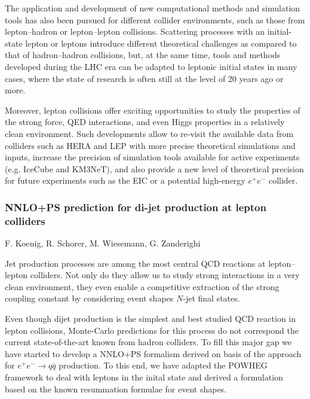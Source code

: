 \documentclass{FBR_Bericht_2025}
\begin{document}
\begin{refsection}
The application and development of new computational methods and simulation tools has also 
been pursued for different collider environments, such as those from lepton--hadron or lepton--lepton collisions.
%
Scattering processes with an initial-state lepton or leptons introduce different theoretical 
challenges as compared to that of hadron--hadron collisions, but, at the same time, tools
and methods developed during the LHC era can be adapted to leptonic initial states
in many cases, where the state of research is often still at the level of 20 years ago or more.

Moreover, lepton collisions offer exciting opportunities to study the properties of the strong force, QED interactions, and even Higgs properties in a relatively clean environment.
%
Such developments allow to re-visit the available data from colliders such as HERA and LEP with more precise theoretical simulations and inputs, increase the precision of simulation tools available for active experiments (e.g. IceCube and KM3NeT), and also provide a new level of theoretical precision for future experiments such as the EIC or a potential high-energy $e^+e^-$ collider. 
%
\subsubsection{NNLO+PS prediction for di-jet production at lepton colliders}
\begin{Namen}
F. Koenig, R. Schorer, M. Wiesemann, G. Zanderighi
\end{Namen}

Jet production processes are among the most central QCD reactions at lepton--lepton colliders.
Not only do they allow us to study strong interactions in a very clean environment, they even 
enable a competitive extraction of the strong coupling constant by considering event shapes 
$N$-jet final states.

Even though dijet production is the simplest and best studied QCD reaction in lepton collisions,
Monte-Carlo predictions for this process do not correspond the current state-of-the-art known
from hadron colliders. To fill this major gap we have started to develop a NNLO+PS formalism
derived on basis of the \minnlo{} approach for $e^+e^-\to q\bar q$ production. To this end,
we have adapted the POWHEG framework to deal with leptons in the inital state and derived
a \minnlo{} formulation based on the known resummation formulae for event shapes.


\end{refsection}
\end{document}
